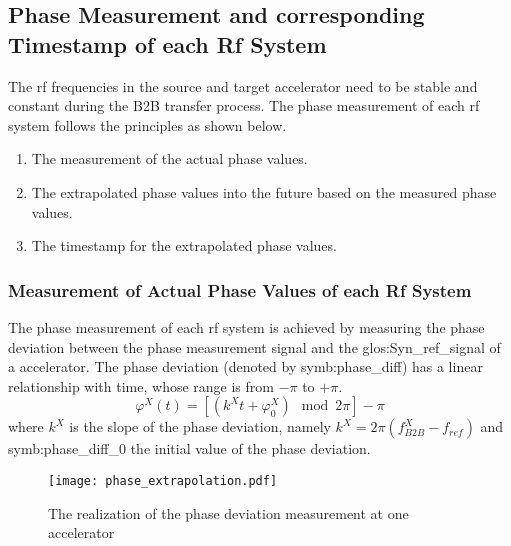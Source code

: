 \subsection{Phase Measurement and corresponding Timestamp of each Rf System}
The rf frequencies in the source and target accelerator need to be stable and constant during the B2B transfer process. The phase measurement of each rf system follows the principles as shown below.

\begin{enumerate}
\item The measurement of the actual phase values.
\item The extrapolated phase values into the future based on the measured phase values.
\item The timestamp for the extrapolated phase values.
\end{enumerate}


 \subsubsection{Measurement of Actual Phase Values of each Rf System}
The phase measurement of each rf system is achieved by measuring the phase deviation between the phase measurement signal and the \gls{glos:Syn_ref_signal} of a accelerator. The phase deviation (denoted by \gls{symb:phase_diff}) has a linear relationship with time, whose range is from $-\pi$ to $+\pi$. 
\begin{equation}
\varphi^X(t)= [(k^\mathit{X}t+\varphi^X_0) \mod 2\pi] - \pi
\end{equation}
where $k^\mathit{X}$ is the slope of the phase deviation, namely $k^\mathit{X}=2\pi(f_\mathit{B2B}^{X}-f_\mathit{ref})$ and \gls{symb:phase_diff_0} the initial value of the phase deviation.



\begin{figure}[!htb]
   \centering   
   \texttt{[image: phase\_extrapolation.pdf]}
   \caption{The realization of the phase deviation measurement at one accelerator}
   \label{phase_prediction}
\end{figure}

